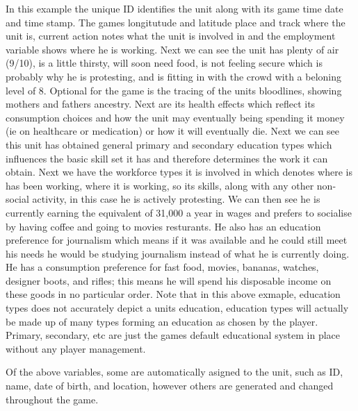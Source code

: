 In this example the unique ID identifies the unit along with its game time date and time stamp. The games longitutude and latitude place and track where the unit is, current action notes what the unit is involved in and the employment variable shows where he is working.
Next we can see the unit has plenty of air (9/10), is a little thirsty, will soon need food, is not feeling secure which is probably why he is protesting, and is fitting in with the crowd with a beloning level of 8. Optional for the game is the tracing of the units bloodlines, showing mothers and fathers ancestry. Next are its health effects which reflect its consumption choices and how the unit may eventually being spending it money (ie on healthcare or medication) or how it will eventually die. Next we can see this unit has obtained general primary and secondary education types which influences the basic skill set it has and therefore determines the work it can obtain. Next we have the workforce types it is involved in which denotes where is has been working, where it is working, so its skills, along with any other non-social activity, in this case he is actively protesting. We can then see he is currently earning the equivalent of 31,000 a year in wages and prefers to socialise by having coffee and going to movies resturants. He also has an education preference for journalism which means if it was available and he could still meet his needs he would be studying journalism instead of what he is currently doing. He has 
a consumption preference for fast food, movies, bananas, watches, designer boots, and rifles; this means he will spend his disposable income on these goods in no particular order. Note that in this above exmaple, education types does not accurately depict a units education, education types will actually be made up of many types forming an education as chosen by the player. Primary, secondary, etc are just the games default educational system in place without any player management.

Of the above variables, some are automatically asigned to the unit, such as ID, name, date of birth, and location, however others are generated and changed throughout the game. 




